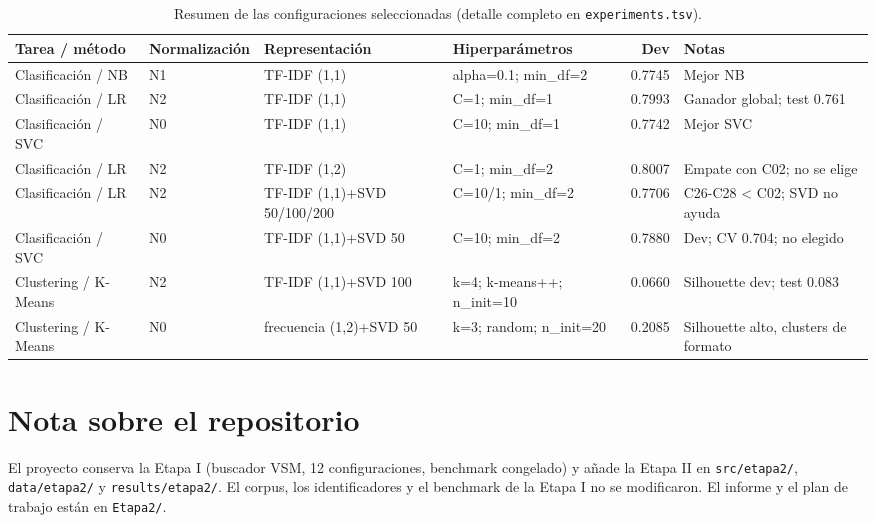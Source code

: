 \documentclass[11pt,a4paper]{article}
\newcommand{\code}[1]{\texttt{#1}}
\begin{document}
\begin{table}[!htbp]
\centering
\small
\caption{Resumen de las configuraciones seleccionadas (detalle completo en
\code{experiments.tsv}).}
\label{tab:resumen}
\footnotesize
\begin{tabular}{@{}>{\raggedright\arraybackslash}p{2.5cm}>{\raggedright\arraybackslash}p{2.0cm}>{\raggedright\arraybackslash}p{2.4cm}>{\raggedright\arraybackslash}p{3.6cm}r>{\raggedright\arraybackslash}p{2.2cm}@{}}
\toprule
Tarea / método & Normalización & Representación & Hiperparámetros & Dev & Notas\\
\midrule
Clasificación / NB & N1 & TF-IDF (1,1) & alpha=0.1; min\_df=2 & 0.7745 & Mejor NB\\
Clasificación / LR & N2 & TF-IDF (1,1) & C=1; min\_df=1 & 0.7993 & Ganador global; test 0.761\\
Clasificación / SVC & N0 & TF-IDF (1,1) & C=10; min\_df=1 & 0.7742 & Mejor SVC\\
Clasificación / LR & N2 & TF-IDF (1,2) & C=1; min\_df=2 & 0.8007 & Empate con C02; no se elige\\
Clasificación / LR & N2 & TF-IDF (1,1)+SVD 50/100/200 & C=10/1; min\_df=2 & 0.7706 & C26-C28 < C02; SVD no ayuda\\
Clasificación / SVC & N0 & TF-IDF (1,1)+SVD 50 & C=10; min\_df=2 & 0.7880 & Dev; CV 0.704; no elegido\\
Clustering / K-Means & N2 & TF-IDF (1,1)+SVD 100 & k=4; k-means++; n\_init=10 & 0.0660 & Silhouette dev; test 0.083\\
Clustering / K-Means & N0 & frecuencia (1,2)+SVD 50 & k=3; random; n\_init=20 & 0.2085 & Silhouette alto, clusters de formato\\
\bottomrule
\end{tabular}
\end{table}

\section{Nota sobre el repositorio}
El proyecto conserva la Etapa I (buscador VSM, 12 configuraciones, benchmark congelado) y
añade la Etapa II en \code{src/etapa2/}, \code{data/etapa2/} y \code{results/etapa2/}. El
corpus, los identificadores y el benchmark de la Etapa I no se modificaron. El informe y el
plan de trabajo están en \code{Etapa2/}.
\end{document}

